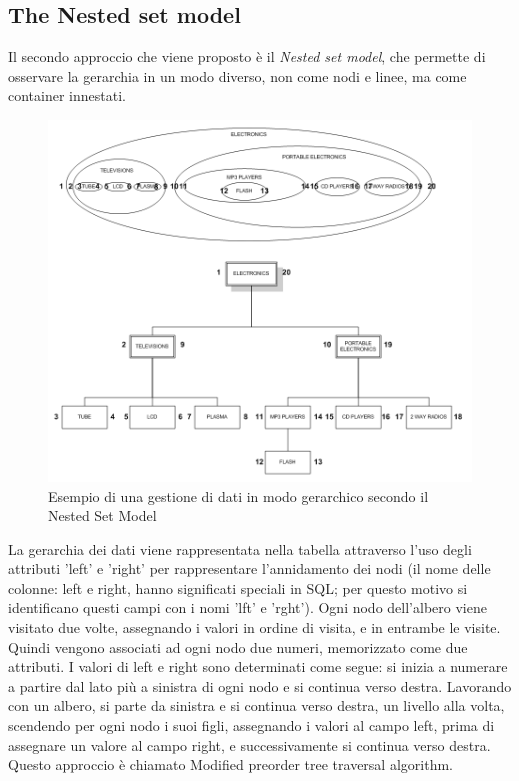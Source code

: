 \subsection{The Nested set model}
Il secondo approccio che viene proposto è il \textit{Nested set model}, che permette di osservare la gerarchia in un modo diverso, non 
come nodi e linee, ma come container innestati. \\

\begin{figure}[ht!]
    \centering
	\includegraphics[scale=0.55]{images/Nested_Tree_Model_ex.png}
	\caption{Esempio di una gestione di dati in modo gerarchico secondo il Nested Set Model}
\end{figure}

La gerarchia dei dati viene rappresentata nella tabella attraverso l'uso degli attributi 'left' e 'right' per rappresentare l'annidamento
dei nodi (il nome delle colonne: left e right, hanno significati speciali in SQL; per questo motivo si identificano questi campi con i 
nomi 'lft' e 'rght'). 
Ogni nodo dell'albero viene visitato due volte, assegnando i valori in ordine di visita, e in entrambe le visite. Quindi vengono 
associati ad ogni nodo due numeri, memorizzato come due attributi. 
I valori di left e right sono determinati come segue: si inizia a numerare a partire dal lato più a sinistra di ogni nodo e si continua 
verso destra. Lavorando con un albero, si parte da sinistra e si continua verso destra, un livello alla volta, scendendo per ogni
nodo i suoi figli, assegnando i valori al campo left, prima di assegnare un valore al campo right, e successivamente si continua verso 
destra. Questo approccio è chiamato Modified preorder tree traversal algorithm.

